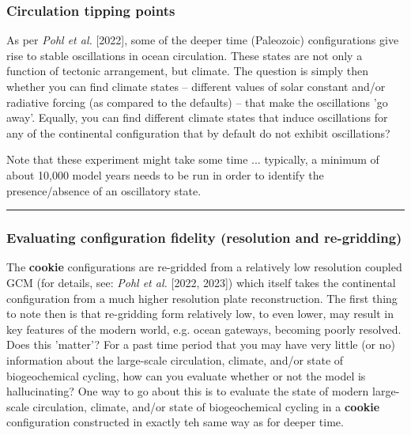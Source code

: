 \subsubsection{Circulation tipping points}

\vspace{2mm}
As per \textit{Pohl et al.} [2022], some of the deeper time (Paleozoic) configurations give rise to stable oscillations in ocean circulation. These states are not only a function of tectonic arrangement, but climate. The question is simply then whether you can find climate states -- different values of solar constant and/or radiative forcing (as compared to the defaults) -- that make the oscillations 'go away'. Equally, you can find different climate states that induce oscillations for any of the continental configuration that by default do not exhibit oscillations?

\vspace{1mm}
Note that these experiment might take some time ... typically, a minimum of about 10,000 model years needs to be run in order to identify the presence/absence of an oscillatory state.

\vspace{1mm}\noindent\rule{4cm}{0.5pt}\vspace{2mm}

\newpage

\subsubsection{Evaluating configuration fidelity (resolution and re-gridding)}

\vspace{2mm}
The \textbf{cookie} configurations are re-gridded from a relatively low resolution coupled GCM (for details, see: \textit{Pohl et al.} [2022, 2023]) which itself takes the continental configuration from a much higher resolution plate reconstruction. The first thing to note then is that re-gridding form relatively low, to even lower, may result in key features of the modern world, e.g. ocean gateways, becoming poorly resolved. Does this 'matter'? For a past time period that you may have very little (or no) information about the large-scale circulation, climate, and/or state of biogeochemical cycling, how can you evaluate whether or not the model is hallucinating? 
One way to go about this is to evaluate the state of modern large-scale circulation, climate, and/or state of biogeochemical cycling in a \textbf{cookie} configuration constructed in exactly teh same way as for deeper time.

